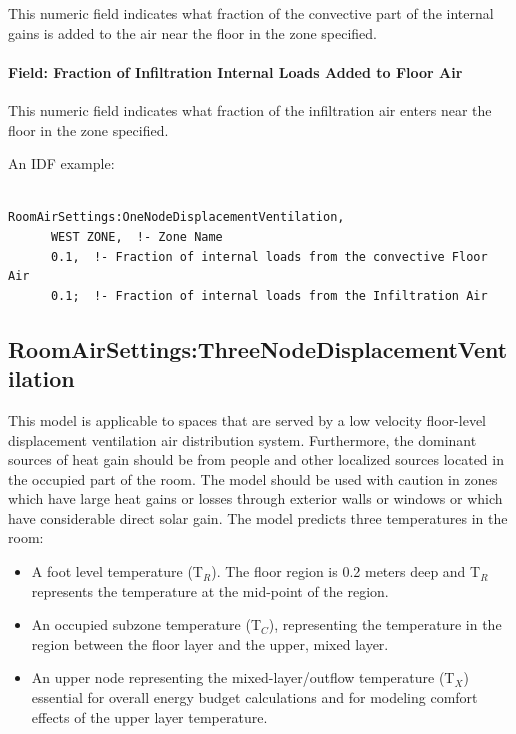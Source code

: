 This numeric field indicates what fraction of the convective part of the internal gains is added to the air near the floor in the zone specified.

\paragraph{Field: Fraction of Infiltration Internal Loads Added to Floor Air}\label{field-fraction-of-infiltration-internal-loads-added-to-floor-air}

This numeric field indicates what fraction of the infiltration air enters near the floor in the zone specified.

An IDF example:

\begin{lstlisting}

RoomAirSettings:OneNodeDisplacementVentilation,
      WEST ZONE,  !- Zone Name
      0.1,  !- Fraction of internal loads from the convective Floor Air
      0.1;  !- Fraction of internal loads from the Infiltration Air
\end{lstlisting}

\subsection{RoomAirSettings:ThreeNodeDisplacementVentilation}\label{roomairsettingsthreenodedisplacementventilation}

This model is applicable to spaces that are served by a low velocity floor-level displacement ventilation air distribution system. Furthermore, the dominant sources of heat gain should be from people and other localized sources located in the occupied part of the room. The model should be used with caution in zones which have large heat gains or losses through exterior walls or windows or which have considerable direct solar gain. The model predicts three temperatures in the room:

\begin{itemize}
\item
  A foot level temperature (T\(_{R}\)). The floor region is 0.2 meters deep and T\(_{R}\) represents the temperature at the mid-point of the region.
\item
  An occupied subzone temperature (T\(_{C}\)), representing the temperature in the region between the floor layer and the upper, mixed layer.
\item
  An upper node representing the mixed-layer/outflow temperature (T\(_{X}\)) essential for overall energy budget calculations and for modeling comfort effects of the upper layer temperature.
\end{itemize}

